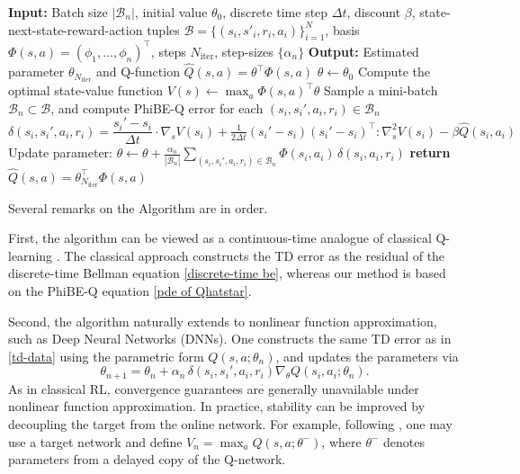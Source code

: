 \documentclass[12pt]{article}
\def\th{\theta}
\def\th{\theta}
\def\dt{{\Delta t}}
\begin{document}
\begin{algorithm}
\caption{PhiBE Q-learning Method}
\begin{algorithmic}\label{algo2}
\STATE \textbf{Input:} Batch size $|\mathcal{B}_n|$, initial value $\theta_0$, discrete time step $\Delta t$, discount $\beta$, state-next-state-reward-action tuples $\mathcal{B} = \{(s_i, s'_i, r_i,a_i)\}_{i=1}^N$, basis $\Phi(s,a)=(\phi_1,\ldots,\phi_n)^\top$, steps $N_{\text{iter}}$, step-sizes $\{\alpha_n\}$
\STATE \textbf{Output:} Estimated parameter $\theta_{N_{\text{iter}}}$ and Q-function $\hat Q(s,a)=\theta^\top\Phi(s,a)$
\STATE $\th \gets \th_0$
    \STATE Compute the optimal state-value function $V(s) \gets \max_a \Phi(s,a)^\top \th$
  \STATE Sample a mini-batch $\mathcal{B}_n\subset\mathcal{B}$, and compute PhiBE-Q error for each $(s_i,s_i',a_i,r_i)\in\mathcal{B}_n$
    \[
      \delta(s_i,s_i',a_i,r_i)= \frac{s_i'-s_i}{\dt}\cdot\nabla_sV(s_i)
        + \tfrac{1}{2\dt}(s_i' - s_i)(s_i' - s_i)^\top:\nabla_s^2V(s_i) - \beta \hat{Q}(s_i,a_i)
    \]
  \STATE Update parameter:
   $\theta\gets\theta +\frac{ \alpha_n}{|\mathcal{B}_n|}\sum_{(s_i,s_i',a_i,r_i)\in\mathcal{B}_n}
    \Phi(s_i,a_i)\,\delta(s_i,a_i,r_i)$
\ENDFOR
\STATE \textbf{return} $\hat Q(s,a)=\theta_{N_{\text{iter}}}^\top\Phi(s,a)$
\end{algorithmic}
\end{algorithm}


Several remarks on the Algorithm are in order. 

First, the algorithm can be viewed as a continuous-time analogue of classical Q-learning \citep{watkins1992q}. The classical approach constructs the TD error as the residual of the discrete-time Bellman equation \eqref{discrete-time be}, whereas our method is based on the PhiBE-Q equation \eqref{pde of Qhatstar}.

Second, the algorithm naturally extends to nonlinear function approximation, such as Deep Neural Networks (DNNs). One constructs the same TD error as in \eqref{td-data} using the parametric form  $Q(s,a;\th_n)$, and updates the parameters via
\[
\th_{n+1} = \th_n + \alpha_n \, \delta(s_i,s_i',a_i,r_i)\nabla_\th Q(s_i,a_i;\th_n).
\]
As in classical RL, convergence guarantees are generally unavailable under nonlinear function approximation. In practice, stability can be improved by decoupling the target from the online network. For example, following \citep{mnih2015human}, one may use a target network and define $V_n = \max_a Q(s,a;\th^-)$,
where $\th^-$ denotes parameters from a delayed copy of the Q-network.
\end{document}
